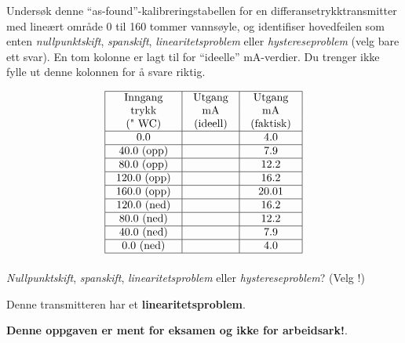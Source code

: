 
Undersøk denne ``as-found''-kalibreringstabellen for en differansetrykktransmitter med lineært område 0 til 160 tommer vannsøyle, og identifiser hovedfeilen som enten \textit{nullpunktskift}, \textit{spanskift}, \textit{linearitetsproblem} eller \textit{hystereseproblem} (velg bare ett svar). En tom kolonne er lagt til for ``ideelle'' mA-verdier. Du trenger ikke fylle ut denne kolonnen for å svare riktig.


$$\vbox{\offinterlineskip
\halign{\strut
\vrule \quad\hfil # \ \hfil & 
\vrule \quad\hfil # \ \hfil & 
\vrule \quad\hfil # \ \hfil \vrule \cr
\noalign{\hrule}
%
Inngang & Utgang & Utgang \cr
%
trykk & mA & mA \cr
%
(" WC) & (ideell) & (faktisk) \cr
%
\noalign{\hrule}
%
0.0 & & 4.0 \cr
%
\noalign{\hrule}
%
40.0 (opp) & & 7.9 \cr
%
\noalign{\hrule}
%
80.0 (opp) & & 12.2 \cr
%
\noalign{\hrule}
%
120.0 (opp) & & 16.2 \cr
%
\noalign{\hrule}
%
160.0 (opp) & & 20.01 \cr
%
\noalign{\hrule}
%
120.0 (ned) & & 16.2 \cr
%
\noalign{\hrule}
%
80.0 (ned) & & 12.2 \cr
%
\noalign{\hrule}
%
40.0 (ned) & & 7.9 \cr
%
\noalign{\hrule}
%
0.0 (ned) & & 4.0 \cr
%
\noalign{\hrule}
} %
}$$ %

\textit{Nullpunktskift}, \textit{spanskift}, \textit{linearitetsproblem} eller \textit{hystereseproblem}? (Velg !)







Denne transmitteren har et {\bf linearitetsproblem}.







{\bf Denne oppgaven er ment for eksamen og ikke for arbeidsark!}.


